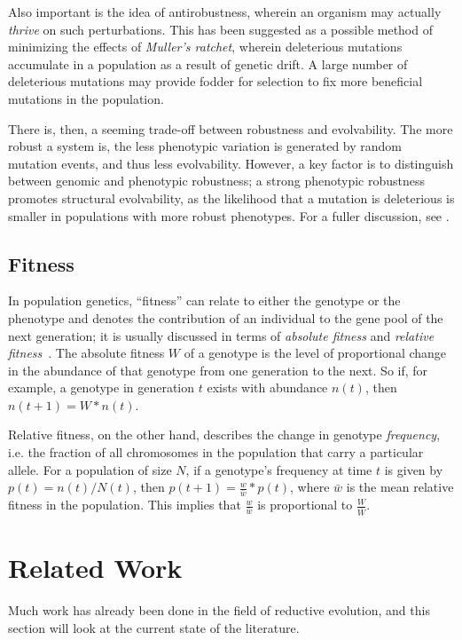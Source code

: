 Also important is the idea of antirobustness, wherein an organism may actually \textit{thrive} on such perturbations. This has been suggested as a possible method of minimizing the effects of \textit{Muller's ratchet}, wherein deleterious mutations accumulate in a population as a result of genetic drift\cite{Gordo2137}. A large number of deleterious mutations may provide fodder for selection to fix more beneficial mutations in the population\cite{doi:10.1186/s12862-019-1507-z}.

There is, then, a seeming trade-off between robustness and evolvability. The more robust a system is, the less phenotypic variation is generated by random mutation events, and thus less evolvability. However, a key factor is to distinguish between genomic and phenotypic robustness; a strong phenotypic robustness promotes structural evolvability, as the likelihood that a mutation is deleterious is smaller in populations with more robust phenotypes. For a fuller discussion, see \cite{doi:10.1098/rspb.2007.1137}.

\subsection{Fitness}\label{background:fitness}
In population genetics, ``fitness'' can relate to either the genotype or the phenotype and denotes the contribution of an individual to the gene pool of the next generation; it is usually discussed in terms of \textit{absolute fitness} and \textit{relative fitness}~\cite{cutter2019primer}. The absolute fitness $W$ of a genotype is the level of proportional change in the abundance of that genotype from one generation to the next. So if, for example, a genotype in generation $t$ exists with abundance $n(t)$, then $n(t+1) = W*n(t)$. 

Relative fitness, on the other hand, describes the change in genotype \textit{frequency}, i.e. the fraction of all chromosomes in the population that carry a particular allele. For a population of size $N$, if a genotype's frequency at time $t$ is given by $p(t) = n(t)/N(t)$, then $p(t+1) = \frac{w}{\bar{w}}*p(t)$, where $\bar{w}$ is the mean relative fitness in the population. This implies that $\frac{w}{\bar{w}}$ is proportional to $\frac{W}{\bar{W}}$. 

 

\section{Related Work}\label{related_work}
Much work has already been done in the field of reductive evolution, and this section will look at the current state of the literature. 

